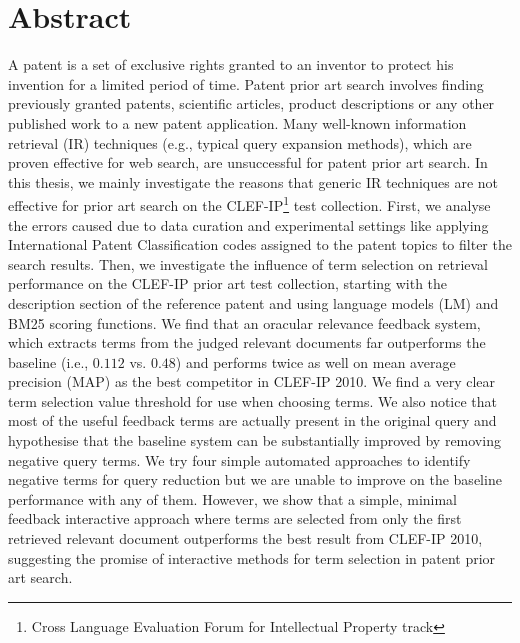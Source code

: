 \chapter*{Abstract}
\vspace{-1em}
A patent is a set of exclusive rights granted to an inventor to protect 
his invention for a limited period of time. Patent prior art search involves 
finding previously granted patents, 
scientific articles, product descriptions or any other published work 
to a new patent application.
Many well-known information retrieval (IR) techniques (e.g., typical query expansion methods), which are proven effective 
for web search, are unsuccessful for patent 
prior art search.
In this thesis, we mainly investigate the reasons that generic IR techniques are not 
effective for prior art search on the CLEF-IP\footnote{Cross Language Evaluation Forum for Intellectual Property track} test collection.   
First, we analyse the errors caused due to data curation and experimental settings 
like applying International Patent Classification codes assigned to the patent topics 
to filter the search results.  
Then, we investigate the influence of term selection on retrieval
performance on the CLEF-IP prior art test collection, starting with
the description section of the reference patent and using language models (LM) and BM25
scoring functions. We find that an oracular relevance feedback system,
which extracts terms from the judged relevant documents far
outperforms the baseline (i.e., $0.112$ vs. $ 0.48 $) and performs twice as well on mean average precision (MAP) as the best
competitor in CLEF-IP 2010. We find a very clear term selection value
threshold for use when choosing terms.  We also notice that most of
the useful feedback terms are actually present in the original query
and hypothesise that the baseline system can be substantially
improved by removing negative query terms.
We try four simple automated approaches to identify negative terms
for query reduction but we are unable to improve on the baseline
performance with any of them. However, we show that a
simple, minimal feedback interactive approach where terms are selected
from only the first retrieved relevant document outperforms the best
result from CLEF-IP 2010, suggesting the promise of interactive methods
for term selection in patent prior art search.

